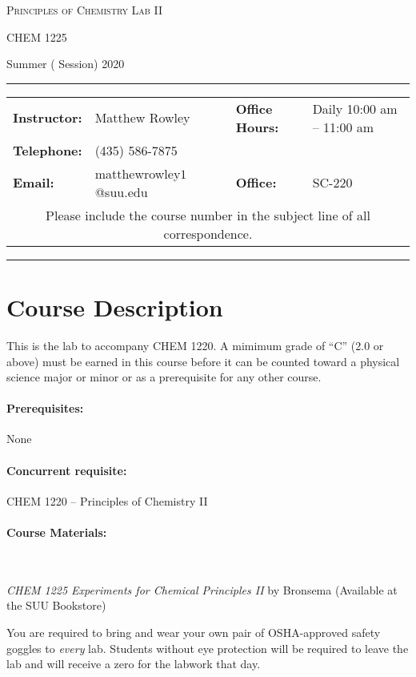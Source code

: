 \documentclass[12pt, letterpaper]{article}
\begin{document}
\begin{center}
{\Large \textsc{Principles of Chemistry Lab II}}

CHEM 1225
\end{center}
\begin{center}
{\large Summer ( Session) 2020}
\end{center}
\begin{center}
	\rule{0.98\textwidth}{0.4pt}
	\begin{tabular}{llcll}
		\textbf{Instructor:} & Matthew Rowley & & \textbf{Office Hours:} & Daily 10:00 am -- 11:00 am \\
		\textbf{Telephone:} & (435) 586-7875 & & & \\
		\textbf{Email:} & matthewrowley$1$@suu.edu  & & \textbf{Office:} & SC-220\\
		\multicolumn{5}{c}{Please include the course number in the subject line of all correspondence.} 
	\end{tabular}
	\rule{0.98\textwidth}{0.4pt}
\end{center}

\section*{Course Description} 
This is the lab to accompany CHEM 1220. A mimimum grade of ``C'' (2.0 or above) must be earned in this course before it can be counted toward a physical science major or minor or as a prerequisite for any other course.

\paragraph{Prerequisites:}
None

\paragraph{Concurrent requisite:}
CHEM 1220 -- Principles of Chemistry II

\paragraph{Course Materials:} ~

\emph{CHEM 1225 Experiments for Chemical Principles II} by Bronsema (Available at the SUU Bookstore)

You are required to bring and wear your own pair of OSHA-approved safety goggles to \emph{every} lab. Students without eye protection will be required to leave the lab and will receive a zero for the labwork that day.
\end{document}
